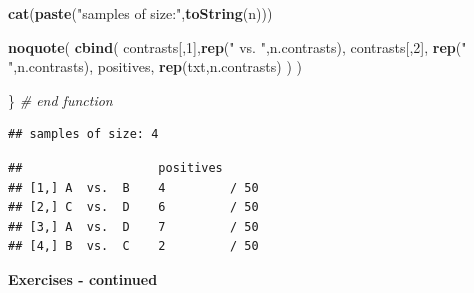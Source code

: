\documentclass[]{book}
\newenvironment{Shaded}{\begin{snugshade}}{\end{snugshade}}
\newcommand{\CommentTok}[1]{\textcolor[rgb]{0.56,0.35,0.01}{\textit{#1}}}
\newcommand{\DataTypeTok}[1]{\textcolor[rgb]{0.13,0.29,0.53}{#1}}
\newcommand{\DecValTok}[1]{\textcolor[rgb]{0.00,0.00,0.81}{#1}}
\newcommand{\KeywordTok}[1]{\textcolor[rgb]{0.13,0.29,0.53}{\textbf{#1}}}
\newcommand{\NormalTok}[1]{#1}
\newcommand{\OperatorTok}[1]{\textcolor[rgb]{0.81,0.36,0.00}{\textbf{#1}}}
\newcommand{\StringTok}[1]{\textcolor[rgb]{0.31,0.60,0.02}{#1}}
\begin{document}
\begin{Shaded}
\begin{Highlighting}[]
    \KeywordTok{cat}\NormalTok{(}\KeywordTok{paste}\NormalTok{(}\StringTok{"samples of size:"}\NormalTok{,}\KeywordTok{toString}\NormalTok{(n)))  }

    \KeywordTok{noquote}\NormalTok{( }\KeywordTok{cbind}\NormalTok{( contrasts[,}\DecValTok{1}\NormalTok{],}\KeywordTok{rep}\NormalTok{(}\StringTok{" vs. "}\NormalTok{,n.contrasts),}
\NormalTok{                contrasts[,}\DecValTok{2}\NormalTok{], }\KeywordTok{rep}\NormalTok{(}\StringTok{"  "}\NormalTok{,n.contrasts), positives,}
                \KeywordTok{rep}\NormalTok{(txt,n.contrasts)  ) )}

\NormalTok{\} }\CommentTok{# end function}
\end{Highlighting}
\end{Shaded}

\begin{Shaded}
\end{Shaded}

\begin{verbatim}
## samples of size: 4
\end{verbatim}

\begin{verbatim}
##                   positives     
## [1,] A  vs.  B    4         / 50
## [2,] C  vs.  D    6         / 50
## [3,] A  vs.  D    7         / 50
## [4,] B  vs.  C    2         / 50
\end{verbatim}

\textbf{Exercises - continued}
\end{document}
